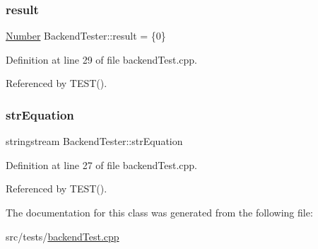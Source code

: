 \mbox{\label{class_backend_tester_a4c0eeb2e7a5f1ef876b6e61fdb1701fc}} 
\subsubsection{\texorpdfstring{result}{result}}
{\footnotesize\ttfamily \hyperlink{classteam22_1_1_math_1_1_number}{Number} Backend\+Tester\+::result = \{0\}}



Definition at line 29 of file backend\+Test.\+cpp.



Referenced by T\+E\+S\+T().

\mbox{\label{class_backend_tester_ac42c696a31021852c1868c2e45f1d8b1}} 
\subsubsection{\texorpdfstring{str\+Equation}{strEquation}}
{\footnotesize\ttfamily stringstream Backend\+Tester\+::str\+Equation}



Definition at line 27 of file backend\+Test.\+cpp.



Referenced by T\+E\+S\+T().



The documentation for this class was generated from the following file\+:\begin{DoxyCompactItemize}
\item 
src/tests/\hyperlink{backend_test_8cpp}{backend\+Test.\+cpp}\end{DoxyCompactItemize}
